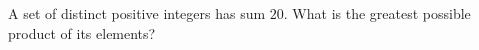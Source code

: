 A set of distinct positive integers has sum $20$. What is the greatest possible product of its elements?
